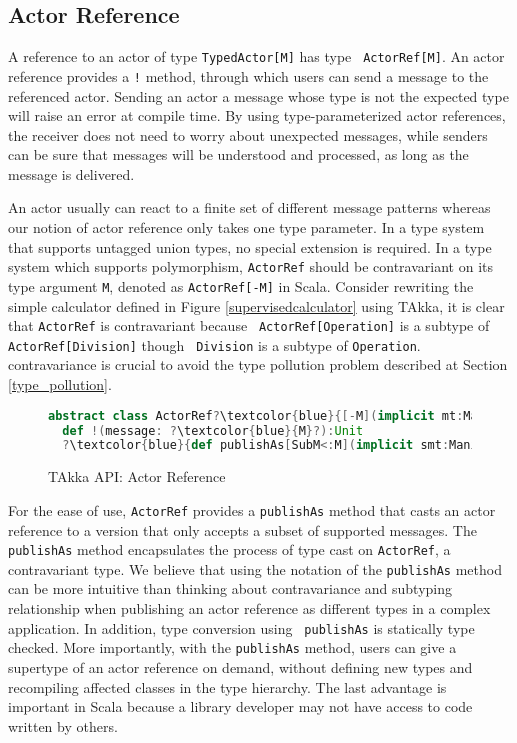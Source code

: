 \subsection{Actor Reference}
\label{actor_ref}
A reference to an actor of type {\tt TypedActor[M]} has type {\tt
ActorRef[M]}.  An actor reference provides a {\tt !} method, through which users
can send a message to the referenced actor.  Sending an actor a
message whose type is not the expected type will raise an error at compile
time. By using type-parameterized actor
references, the receiver does not need to worry about unexpected messages, while
senders can be sure that messages will be understood and processed, as long as
the message is delivered.

An actor usually can react to a finite set of different message patterns 
whereas our notion of actor reference only takes one type parameter.  In a 
type system that supports untagged union types, no special extension is
required.  In a type system which supports polymorphism, {\tt ActorRef} should
be contravariant on its type argument {\tt M}, denoted as {\tt ActorRef[-M]} in Scala.
Consider rewriting the simple calculator defined in Figure \ref{supervisedcalculator} using  
TAkka, it is clear that {\tt ActorRef} is contravariant because {\tt 
ActorRef[Operation]} is a subtype of {\tt ActorRef[Division]} though {\tt 
Division} is a subtype of {\tt Operation}. contravariance is crucial to avoid 
the type pollution problem described at Section \ref{type_pollution}.  

\begin{figure}
\label{ActorRef}
      \begin{lstlisting}[language=scala, escapechar=?]
abstract class ActorRef?\textcolor{blue}{[-M](implicit mt:Manifest[M])}?
  def !(message: ?\textcolor{blue}{M}?):Unit
  ?\textcolor{blue}{def publishAs[SubM<:M](implicit smt:Manifest[SubM]):ActorRef[SubM]}?
    \end{lstlisting}
    \caption{TAkka API: Actor Reference}
\end{figure}

For the ease of use, {\tt ActorRef} provides a {\tt publishAs} method that 
casts an actor reference to a version that only accepts a subset of supported 
messages.  The {\tt publishAs} method encapsulates the process of type cast on 
{\tt ActorRef}, a contravariant type.  We believe that using the notation of the
{\tt publishAs} method can be more intuitive than thinking about contravariance 
and subtyping relationship when publishing an actor reference as different 
types in a complex application.  In addition, type conversion using {\tt 
publishAs} is statically type checked.  More importantly, with the 
{\tt publishAs} method, users can give a supertype of an actor reference on 
demand, without defining new types and recompiling affected classes in the type 
hierarchy.  The last advantage is important in Scala because a library 
developer may not have access to code written by others.

